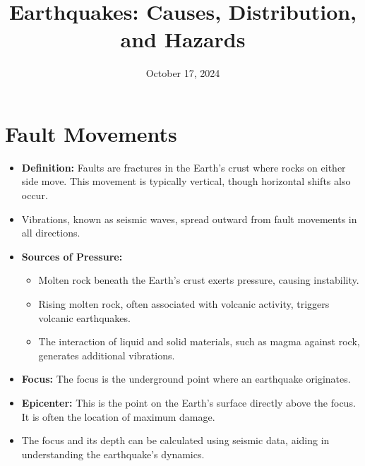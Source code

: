 \documentclass[12pt]{article}
\title{Earthquakes: Causes, Distribution, and Hazards}
\author{}
\date{October 17, 2024}
\begin{document}
\maketitle

\section*{Fault Movements}
\begin{itemize}
    \item \textbf{Definition:} Faults are fractures in the Earth's crust where rocks on either side move. This movement is typically vertical, though horizontal shifts also occur.
    \item Vibrations, known as seismic waves, spread outward from fault movements in all directions.
    \item \textbf{Sources of Pressure:}
    \begin{itemize}
        \item Molten rock beneath the Earth's crust exerts pressure, causing instability.
        \item Rising molten rock, often associated with volcanic activity, triggers volcanic earthquakes.
        \item The interaction of liquid and solid materials, such as magma against rock, generates additional vibrations.
    \end{itemize}
    \item \textbf{Focus:} The focus is the underground point where an earthquake originates.
    \item \textbf{Epicenter:} This is the point on the Earth's surface directly above the focus. It is often the location of maximum damage.
    \item The focus and its depth can be calculated using seismic data, aiding in understanding the earthquake's dynamics.
\end{itemize}
\end{document}
